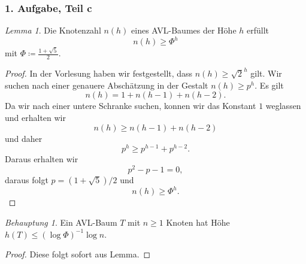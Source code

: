 \documentclass[draft,a5paper]{article}
\theoremstyle{remark}
\newtheorem*{beh}{Behauptung}
\newtheorem*{lem}{Lemma}
\begin{document}
\subsubsection*{1. Aufgabe, Teil c}
\begin{lem}
  Die Knotenzahl \(n(h)\) eines AVL-Baumes der Höhe \(h\) erfüllt
  \[
    n(h) \ge \Phi^{h}
  \] mit \(\Phi \coloneq \frac{1+\sqrt{5}}{2}\).
\end{lem}

\begin{proof}
  In der Vorlesung haben wir festgestellt, dass
  \(n(h) \ge \sqrt{2}^{h}\) gilt. Wir suchen nach einer genauere Abschätzung
  in der Gestalt \(n(h) \ge p^{h}.\) Es gilt
  \[n(h) = 1 + n(h - 1) + n(h-2).\]  Da wir nach einer untere Schranke
  suchen, konnen wir das Konstant \(1\) weglassen und erhalten wir \[
    n(h) \ge n(h-1) + n(h-2) \] und daher \[p^{h} \ge p^{h-1} + p^{h-2}.\]
  Daraus erhalten wir \[p^{2} - p - 1 = 0,\] daraus folgt \(p =
  (1+\sqrt{5})/2\) und \[ n(h) \ge \Phi^{h}.\]
\end{proof}

\begin{beh}
  Ein AVL-Baum \(T\) mit \(n \ge 1\) Knoten hat Höhe \(h(T) \le (\log
  \Phi)^{-1} \log n\).
\end{beh}

\begin{proof}
  Diese folgt sofort aus Lemma.
\end{proof}
\end{document}
